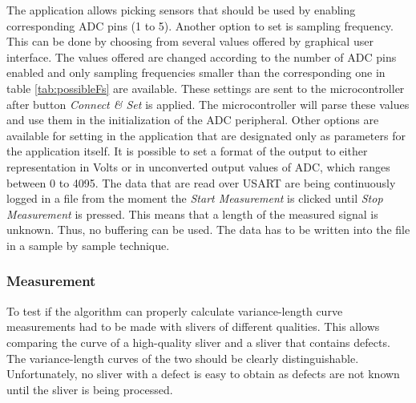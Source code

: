 \documentclass[twoside]{ctuthesis}
\theoremstyle{plain}
\theoremstyle{definition}
\theoremstyle{note}
\begin{document}
The application allows picking sensors that should be used by enabling corresponding ADC pins (1 to 5). Another option to set is sampling frequency. This can be done by choosing from several values offered by graphical user interface. The values offered are changed according to the number of ADC pins enabled and only sampling frequencies smaller than the corresponding one in table \ref{tab:possibleFs} are available. These settings are sent to the microcontroller after button \textit{Connect \& Set} is applied. The microcontroller will parse these values and use them in the initialization of the ADC peripheral.
Other options are available for setting in the application that are designated only as parameters for the application itself. It is possible to set a format of the output to either representation in Volts or in unconverted output values of ADC, which ranges between 0 to 4095.
The data that are read over USART are being continuously logged in a file from the moment the \textit{Start Measurement} is clicked until \textit{Stop Measurement} is pressed. This means that a length of the measured signal is unknown. Thus, no buffering can be used. The data has to be written into the file in a sample by sample technique. %

\subsubsection{Measurement}
\label{sec:measurement}
To test if the algorithm can properly calculate variance-length curve measurements had to be made with slivers of different qualities. This allows comparing the curve of a high-quality sliver and a sliver that contains defects. The variance-length curves of the two should be clearly distinguishable. Unfortunately, no sliver with a defect is easy to obtain as defects are not known until the sliver is being processed. 
\end{document}
